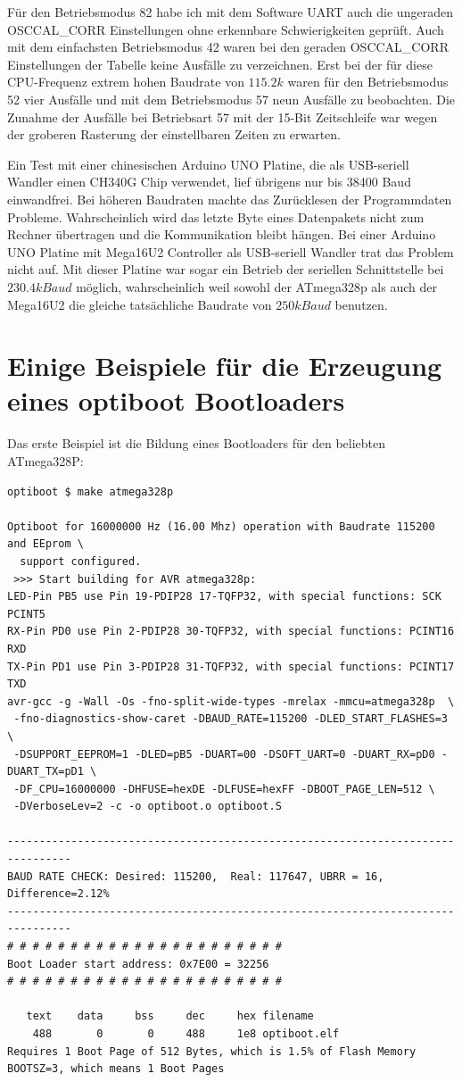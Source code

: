 Für den Betriebsmodus 82 habe ich mit dem Software UART
auch die ungeraden OSCCAL\_CORR Einstellungen ohne erkennbare Schwierigkeiten geprüft.
Auch mit dem einfachsten Betriebsmodus 42 waren bei den geraden OSCCAL\_CORR
Einstellungen der Tabelle keine Ausfälle zu verzeichnen.
Erst bei der für diese CPU-Frequenz extrem hohen Baudrate von \(115.2k\) waren 
für den Betriebsmodus 52 vier Ausfälle und mit dem Betriebsmodus 57 neun Ausfälle
zu beobachten. Die Zunahme der Ausfälle bei Betriebsart 57 mit der 15-Bit Zeitschleife war
wegen der groberen Rasterung der einstellbaren Zeiten zu erwarten.

Ein Test mit einer chinesischen Arduino UNO Platine, die als USB-seriell Wandler einen
CH340G Chip verwendet, lief übrigens nur bis 38400 Baud einwandfrei.
Bei höheren Baudraten machte das Zurücklesen der Programmdaten Probleme.
Wahrscheinlich wird das letzte Byte eines Datenpakets nicht zum Rechner übertragen und
die Kommunikation bleibt hängen. Bei einer Arduino UNO Platine mit Mega16U2 Controller
als USB-seriell Wandler trat das Problem nicht auf. Mit dieser Platine war sogar
ein Betrieb der seriellen Schnittstelle bei \(230.4kBaud\) möglich, wahrscheinlich
weil sowohl der ATmega328p als auch der Mega16U2 die gleiche tatsächliche Baudrate
von \(250kBaud\) benutzen.


\section{Einige Beispiele für die Erzeugung eines optiboot Bootloaders}

Das erste Beispiel ist die Bildung eines Bootloaders für den beliebten ATmega328P:

\begin{verbatim}
optiboot $ make atmega328p

Optiboot for 16000000 Hz (16.00 Mhz) operation with Baudrate 115200 and EEprom \
  support configured.
 >>> Start building for AVR atmega328p:
LED-Pin PB5 use Pin 19-PDIP28 17-TQFP32, with special functions: SCK PCINT5
RX-Pin PD0 use Pin 2-PDIP28 30-TQFP32, with special functions: PCINT16 RXD
TX-Pin PD1 use Pin 3-PDIP28 31-TQFP32, with special functions: PCINT17 TXD
avr-gcc -g -Wall -Os -fno-split-wide-types -mrelax -mmcu=atmega328p  \
 -fno-diagnostics-show-caret -DBAUD_RATE=115200 -DLED_START_FLASHES=3 \
 -DSUPPORT_EEPROM=1 -DLED=pB5 -DUART=00 -DSOFT_UART=0 -DUART_RX=pD0 -DUART_TX=pD1 \
 -DF_CPU=16000000 -DHFUSE=hexDE -DLFUSE=hexFF -DBOOT_PAGE_LEN=512 \
 -DVerboseLev=2 -c -o optiboot.o optiboot.S

--------------------------------------------------------------------------------
BAUD RATE CHECK: Desired: 115200,  Real: 117647, UBRR = 16, Difference=2.12%
--------------------------------------------------------------------------------
# # # # # # # # # # # # # # # # # # # # # #
Boot Loader start address: 0x7E00 = 32256
# # # # # # # # # # # # # # # # # # # # # #

   text	   data	    bss	    dec	    hex	filename
    488	      0	      0	    488	    1e8	optiboot.elf
Requires 1 Boot Page of 512 Bytes, which is 1.5% of Flash Memory
BOOTSZ=3, which means 1 Boot Pages

\end{verbatim}

